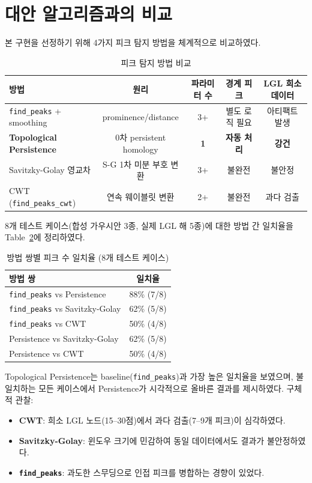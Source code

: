 \documentclass[11pt]{article}
\begin{document}
\section{대안 알고리즘과의 비교}

본 구현을 선정하기 위해 4가지 피크 탐지 방법을 체계적으로 비교하였다.

\begin{table}[h]
\centering
\caption{피크 탐지 방법 비교}
\label{tab:methods}
\begin{tabular}{lcccc}
\toprule
방법 & 원리 & 파라미터 수 & 경계 피크 & LGL 희소 데이터 \\
\midrule
\texttt{find\_peaks} + smoothing & prominence/distance & 3+ & 별도 로직 필요 & 아티팩트 발생 \\
\textbf{Topological Persistence} & 0차 persistent homology & \textbf{1} & \textbf{자동 처리} & \textbf{강건} \\
Savitzky-Golay 영교차 & S-G 1차 미분 부호 변환 & 3+ & 불완전 & 불안정 \\
CWT (\texttt{find\_peaks\_cwt}) & 연속 웨이블릿 변환 & 2+ & 불완전 & 과다 검출 \\
\bottomrule
\end{tabular}
\end{table}

8개 테스트 케이스(합성 가우시안 3종, 실제 LGL 해 5종)에 대한 방법 간 일치율을 Table~\ref{tab:agreement}에 정리하였다.

\begin{table}[h]
\centering
\caption{방법 쌍별 피크 수 일치율 (8개 테스트 케이스)}
\label{tab:agreement}
\begin{tabular}{lc}
\toprule
방법 쌍 & 일치율 \\
\midrule
\texttt{find\_peaks} vs Persistence & 88\% (7/8) \\
\texttt{find\_peaks} vs Savitzky-Golay & 62\% (5/8) \\
\texttt{find\_peaks} vs CWT & 50\% (4/8) \\
Persistence vs Savitzky-Golay & 62\% (5/8) \\
Persistence vs CWT & 50\% (4/8) \\
\bottomrule
\end{tabular}
\end{table}

Topological Persistence는 baseline(\texttt{find\_peaks})과 가장 높은 일치율을 보였으며, 불일치하는 모든 케이스에서 Persistence가 시각적으로 올바른 결과를 제시하였다.
구체적 관찰:
\begin{itemize}[nosep]
\item \textbf{CWT}: 희소 LGL 노드(15--30점)에서 과다 검출(7--9개 피크)이 심각하였다.
\item \textbf{Savitzky-Golay}: 윈도우 크기에 민감하여 동일 데이터에서도 결과가 불안정하였다.
\item \textbf{\texttt{find\_peaks}}: 과도한 스무딩으로 인접 피크를 병합하는 경향이 있었다.
\end{itemize}
\end{document}
